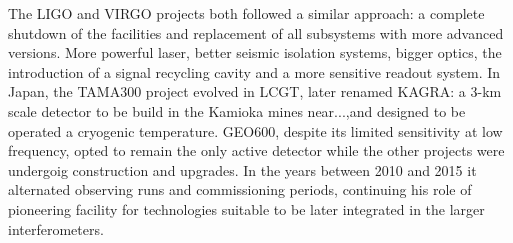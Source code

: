 The LIGO and VIRGO projects both followed a similar approach: a complete shutdown of the facilities and replacement of all subsystems with more advanced versions. More powerful laser, better seismic isolation systems, bigger optics, the introduction of a signal recycling cavity and a more sensitive readout system.
In Japan, the TAMA300 project evolved in LCGT, later renamed KAGRA: a 3-km scale detector to be build in the Kamioka mines near...,and designed to be operated a cryogenic temperature.
GEO600, despite its limited sensitivity at low frequency, opted to remain the only active detector while the other projects were undergoig construction and upgrades. In the years between 2010 and 2015 it alternated observing runs and commissioning periods, continuing his role of pioneering facility for technologies suitable to be later integrated in the larger interferometers.



 

